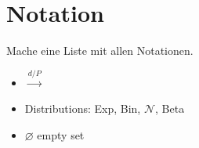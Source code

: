 \chapter*{Notation}

Mache eine Liste mit allen Notationen.
\begin{itemize}
	\item 
	$\overset{d/P}{\longrightarrow}$
	\item 
	Distributions: Exp, Bin, $\mathcal N$, Beta
	\item $\varnothing$ empty set 
\end{itemize}
